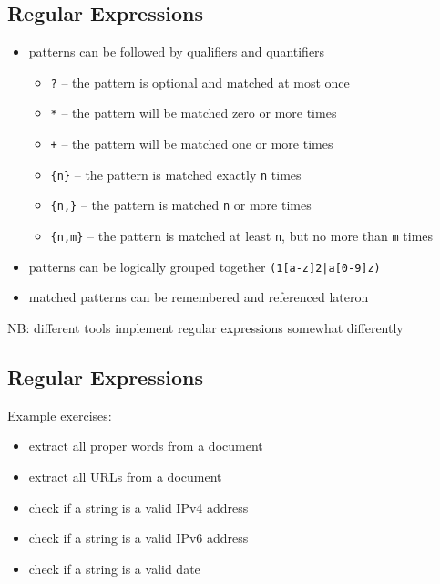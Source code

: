 \documentclass[xga]{xdvislides}
\begin{document}
\subsection{Regular Expressions}
\begin{itemize}
	\item patterns can be followed by qualifiers and quantifiers
		\begin{itemize}
			\item \verb+?+ -- the pattern is optional and matched at most once
			\item \verb+*+ -- the pattern will be matched zero or more times
			\item \verb|+| -- the pattern will be matched one or more times
			\item \verb+{n}+ -- the pattern is matched exactly \verb+n+ times
			\item \verb+{n,}+ -- the pattern is matched \verb+n+ or more times
			\item \verb+{n,m}+ -- the pattern is matched at least \verb+n+,
				but no more than \verb+m+ times
		\end{itemize}
	\item patterns can be logically grouped together \verb+(1[a-z]2|a[0-9]z)+
	\item matched patterns can be remembered and referenced lateron
\end{itemize}
\addvspace{.5in}
NB: different tools implement regular expressions somewhat differently

\subsection{Regular Expressions}
Example exercises:
\begin{itemize}
	\item extract all proper words from a document
	\item extract all URLs from a document
	\item check if a string is a valid IPv4 address
	\item check if a string is a valid IPv6 address
	\item check if a string is a valid date
\end{itemize}
\end{document}
